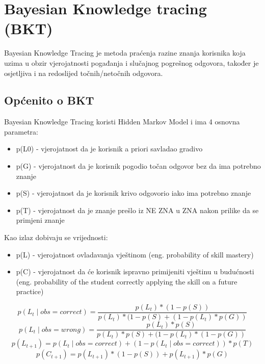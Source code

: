 \documentclass[times, utf8,projekt]{fer}
\begin{document}
\chapter{Bayesian Knowledge tracing (BKT)}
\label{ch:BKT}
Bayesian Knowledge Tracing je metoda praćenja razine znanja korisnika koja uzima u obzir vjerojatnosti pogađanja i slučajnog pogrešnog odgovora, također je osjetljiva i na redoslijed točnih/netočnih odgovora.
\section{Općenito o BKT}
Bayesian Knowledge Tracing koristi Hidden Markov Model i ima 4 osnovna parametra:
\begin{itemize}
	\item p(L0) - vjerojatnost da je korisnik a priori savladao gradivo
	\item p(G) - vjerojatnost da je korisnik pogodio točan odgovor bez da ima potrebno znanje	
	\item p(S) - vjerojatnost da je korisnik krivo odgovorio iako ima potrebno znanje	
	\item p(T) - vjerojatnost da je znanje prešlo iz NE ZNA u ZNA nakon prilike da se primjeni znanje
\end{itemize}
Kao izlaz dobivaju se vrijednosti:
\begin{itemize}
	\item p(L) - vjerojatnost ovladavanja vještinom (eng. probability of skill mastery)
	\item p(C) - vjerojatnost da će korisnik ispravno primijeniti vještinu u budućnosti (eng. probability of the student correctly applying the skill on a future practice)\newline
\end{itemize}

\begin{equation}
 p(L_t\mid obs=correct)=\frac{p(L_t)*(1-p(S))}{p(L_t)*(1-p(S)+(1-p(L_t)*p(G))}
\end{equation}\newline
\begin{equation}
 p(L_t\mid obs=wrong)=\frac{p(L_t)*p(S)}{p(L_t)*p(S)+(1-p(L_t)*(1-p(G))}
\end{equation}\newline
\begin{equation}
 p(L_{t+1})=p(L_t\mid obs=correct) + (1-p(L_t\mid obs=correct))*p(T)
\end{equation}\newline
\begin{equation}
 p(C_{t+1})=p(L_{t+1}) * (1-p(S)) + p(L_{t+1})*p(G)
\end{equation}
\end{document}
